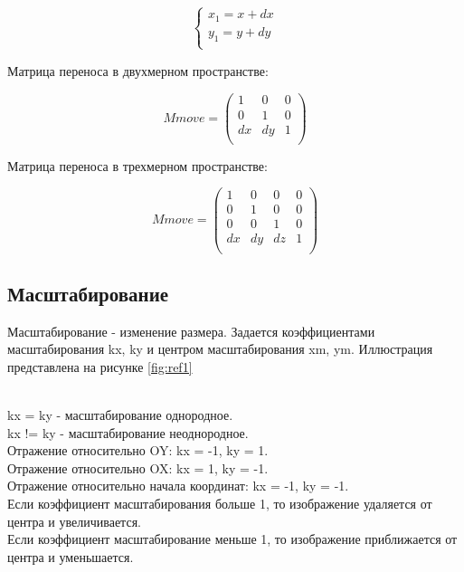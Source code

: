 \begin{equation}
	{\begin{cases}
			x_1 = x + dx \\
			y_1 = y + dy \\
		\end{cases}}
\end{equation}

Матрица переноса в двухмерном пространстве:

\begin{equation}
	Mmove = \left(
	\begin{array}{cccc}
			1  & 0  & 0 \\
			0  & 1  & 0 \\
			dx & dy & 1 \\
		\end{array}
	\right)
\end{equation}

Матрица переноса в трехмерном пространстве:

\begin{equation}
	Mmove = \left(
	\begin{array}{cccc}
			1  & 0  & 0  & 0 \\
			0  & 1  & 0  & 0 \\
			0  & 0  & 1  & 0 \\
			dx & dy & dz & 1 \\
		\end{array}
	\right)
\end{equation}

\subsection {Масштабирование}

Масштабирование - изменение размера. Задается коэффициентами масштабирования kx, ky и центром масштабирования xm, ym. Иллюстрация представлена на рисунке \ref{fig:ref1} \\
\begin{figure}[ht!]
\end{figure}
\\
kx = ky - масштабирование однородное.\\
kx != ky - масштабирование неоднородное.\\
Отражение относительно OY: kx = -1, ky = 1.\\
Отражение относительно OX: kx = 1, ky = -1.\\
Отражение относительно начала координат: kx = -1, ky = -1.\\
Если коэффициент масштабирования больше 1, то изображение удаляется от центра и увеличивается.\\
Если коэффициент масштабирование меньше 1, то изображение приближается от центра и уменьшается.\\

